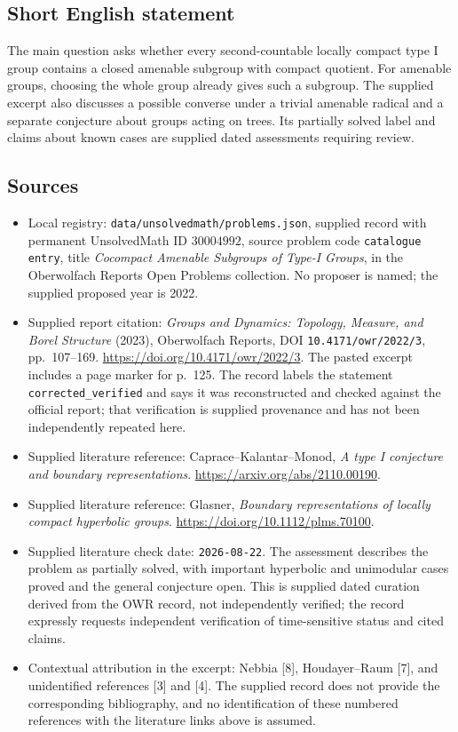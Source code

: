 \documentclass[11pt]{article}
\begin{document}
\subsection{Short English statement}
The main question asks whether every second-countable locally compact type I group contains a closed amenable subgroup with compact quotient. For amenable groups, choosing the whole group already gives such a subgroup. The supplied excerpt also discusses a possible converse under a trivial amenable radical and a separate conjecture about groups acting on trees. Its partially solved label and claims about known cases are supplied dated assessments requiring review.
\subsection{Sources}
\begin{itemize}
\item Local registry: \texttt{data/unsolvedmath/problems.json}, supplied record with permanent UnsolvedMath ID \(30004992\), source problem code \texttt{catalogue entry}, title \emph{Cocompact Amenable Subgroups of Type-I Groups}, in the Oberwolfach Reports Open Problems collection. No proposer is named; the supplied proposed year is 2022.
\item Supplied report citation: \emph{Groups and Dynamics: Topology, Measure, and Borel Structure} (2023), Oberwolfach Reports, DOI \texttt{10.4171/owr/2022/3}, pp.~107--169. \url{https://doi.org/10.4171/owr/2022/3}. The pasted excerpt includes a page marker for p.~125. The record labels the statement \texttt{corrected\_verified} and says it was reconstructed and checked against the official report; that verification is supplied provenance and has not been independently repeated here.
\item Supplied literature reference: Caprace--Kalantar--Monod, \emph{A type I conjecture and boundary representations}. \url{https://arxiv.org/abs/2110.00190}.
\item Supplied literature reference: Glasner, \emph{Boundary representations of locally compact hyperbolic groups}. \url{https://doi.org/10.1112/plms.70100}.
\item Supplied literature check date: \texttt{2026-08-22}. The assessment describes the problem as partially solved, with important hyperbolic and unimodular cases proved and the general conjecture open. This is supplied dated curation derived from the OWR record, not independently verified; the record expressly requests independent verification of time-sensitive status and cited claims.
\item Contextual attribution in the excerpt: Nebbia [8], Houdayer--Raum [7], and unidentified references [3] and [4]. The supplied record does not provide the corresponding bibliography, and no identification of these numbered references with the literature links above is assumed.
\end{itemize}
\end{document}
